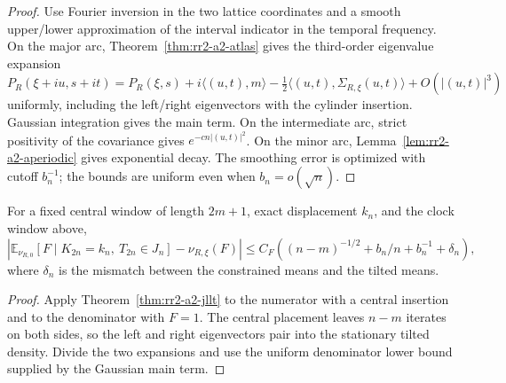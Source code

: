 \begin{proof}
Use Fourier inversion in the two lattice coordinates and a smooth
upper/lower approximation of the interval indicator in the temporal
frequency.  On the major arc, Theorem~\ref{thm:rr2-a2-atlas} gives the
third-order eigenvalue expansion
\[
 P_R(\xi+iu,s+it)
 =P_R(\xi,s)+i\langle(u,t),m\rangle
 -\tfrac12\langle(u,t),\Sigma_{R,\xi}(u,t)\rangle
 +O(|(u,t)|^3)
\]
uniformly, including the left/right eigenvectors with the cylinder
insertion.  Gaussian integration gives the main term.  On the intermediate
arc, strict positivity of the covariance gives \(e^{-cn|(u,t)|^2}\).
On the minor arc, Lemma~\ref{lem:rr2-a2-aperiodic} gives exponential decay.
The smoothing error is optimized with cutoff \(b_n^{-1}\); the bounds are
uniform even when \(b_n=o(\sqrt n)\).
\end{proof}

\begin{corollary}
\label{cor:rr2-a2-conditioning}
For a fixed central window of length \(2m+1\), exact displacement \(k_n\), and
the clock window above,
\[
 \left|
 \mathbb E_{\nu_{R,0}}\!\left[
 F\mid K_{2n}=k_n,\ T_{2n}\in J_n\right]
 -\nu_{R,\xi}(F)
 \right|
 \le C_F\left((n-m)^{-1/2}+b_n/n+b_n^{-1}+\delta_n\right),
\]
where \(\delta_n\) is the mismatch between the constrained means and the
tilted means.
\end{corollary}

\begin{proof}
Apply Theorem~\ref{thm:rr2-a2-jllt} to the numerator with a central insertion
and to the denominator with \(F=1\).  The central placement leaves
\(n-m\) iterates on both sides, so the left and right eigenvectors pair into
the stationary tilted density.  Divide the two expansions and use the
uniform denominator lower bound supplied by the Gaussian main term.
\end{proof}
